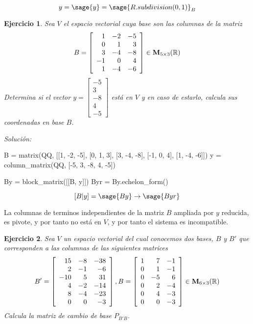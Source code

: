 \documentclass{amsart}
\newtheorem{ejer}{Ejercicio}
\def\r{\mathbb{R}}
\begin{document}
$$ y = \sage{y} = {\sage{R.subdivision(0,1)}}_B $$


\begin{ejer} Sea $V$ el espacio vectorial cuya base son las columnas de la matriz
\[ B = \left[\begin{array}{rrr}
1 & -2 & -5 \\
0 & 1 & 3 \\
3 & -4 & -8 \\
-1 & 0 & 4\\
1 & -4 & -6
\end{array}\right] \in {\bf M}_{5 \times 3}(\r )\]
Determina si el vector $y = {\left[\begin{array}{r}
-5 \\
3 \\
-8 \\
4 \\
-5
\end{array}\right]}$ est\'a en $V$ y en caso de estarlo, calcula sus coordenadas 
en base $B$.
\end{ejer}
{\it Soluci\'on:}

\begin{sageblock}
B = matrix(QQ, [[1, -2, -5], [0, 1, 3], [3, -4, -8], [-1, 0, 4], [1, -4, -6]])
y = column_matrix(QQ, [-5, 3, -8, 4, -5])

By = block_matrix([[B, y]])
Byr = By.echelon_form()
\end{sageblock}

$$
	[B|y] = \sage{By} \to \sage{Byr}
$$

La columnas de terminos independientes de la matriz $B$ ampliada por $y$ reducida, es pivote, y por tanto no está en $V$, y por tanto el sistema es incompatible.


\begin{ejer} Sea $V$ un espacio vectorial del cual conocemos dos bases, $B$ y 
$B'$ que corresponden a las columnas de las siguientes matrices
\[ B' = \left[\begin{array}{rrr}
15 & -8 & -38 \\
2 & -1 & -6 \\
-10 & 5 & 31 \\
4 & -2 & -14 \\
8 & -4 & -23 \\
0 & 0 & -3
\end{array}\right] , B = \left[\begin{array}{rrr}
1 & 7 & -1 \\
0 & 1 & -1 \\
0 & -5 & 6 \\
0 & 2 & -4 \\
0 & 4 & -3 \\
0 & 0 & -3
\end{array}\right] \in {\bf  M}_{6 \times 3}({\mathbb R})\]
Calcula la matriz de cambio de base $P_{B'B}$.
\end{ejer}
\end{document}
